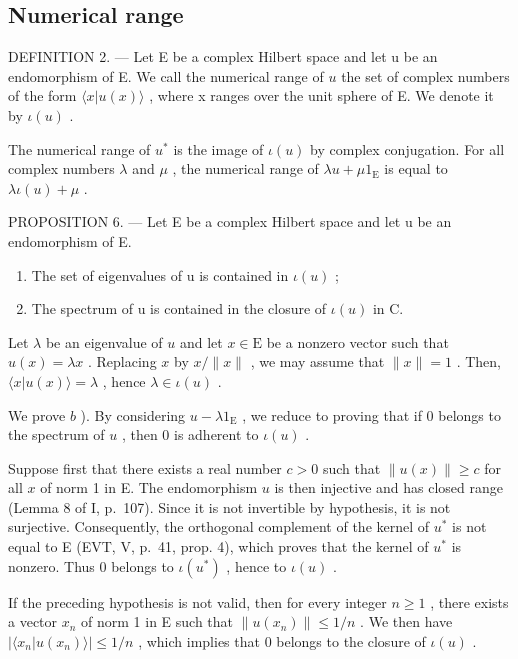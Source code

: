 \subsection{Numerical range}

DEFINITION 2. --- Let E be a complex Hilbert space and let u be an endomorphism of E. We call the numerical range of \(u\) the set of complex numbers of the form \(\langle x|u(x)\rangle\) , where x ranges over the unit sphere of E. We denote it by \(\iota(u)\) .

The numerical range of \(u^{*}\) is the image of \(\iota(u)\) by complex conjugation. For all complex numbers \(\lambda\) and \(\mu\) , the numerical range of \(\lambda u + \mu 1_{\mathrm{E}}\) is equal to \(\lambda \iota(u) + \mu\) .

PROPOSITION 6. — Let E be a complex Hilbert space and let u be an endomorphism of E.

\begin{enumerate}
\def\labelenumi{\alph{enumi})}
\item
  The set of eigenvalues of u is contained in \(\iota(u)\) ;
\item
  The spectrum of u is contained in the closure of \(\iota(u)\) in C.
\end{enumerate}

Let \(\lambda\) be an eigenvalue of \(u\) and let \(x \in \mathrm{E}\) be a nonzero vector such that \(u(x) = \lambda x\) . Replacing \(x\) by \(x / \| x\|\) , we may assume that \(\| x \| = 1\) . Then, \(\langle x | u(x) \rangle = \lambda\) , hence \(\lambda \in \iota(u)\) .

We prove \(b\) ). By considering \(u - \lambda 1_{\mathrm{E}}\) , we reduce to proving that if 0 belongs to the spectrum of \(u\) , then 0 is adherent to \(\iota(u)\) .

Suppose first that there exists a real number \(c > 0\) such that \(\| u(x)\| \geqslant c\) for all \(x\) of norm 1 in E. The endomorphism \(u\) is then injective and has closed range (Lemma 8 of I, p.~107). Since it is not invertible by hypothesis, it is not surjective. Consequently, the orthogonal complement of the kernel of \(u^{*}\) is not equal to E (EVT, V, p.~41, prop. 4), which proves that the kernel of \(u^{*}\) is nonzero. Thus 0 belongs to \(\iota(u^{*})\) , hence to \(\iota(u)\) .

If the preceding hypothesis is not valid, then for every integer \(n \geqslant 1\) , there exists a vector \(x_{n}\) of norm 1 in E such that \(\|u(x_{n})\| \leqslant 1/n\) . We then have \(|\langle x_{n}|u(x_{n})\rangle| \leqslant 1/n\) , which implies that 0 belongs to the closure of \(\iota(u)\) .

